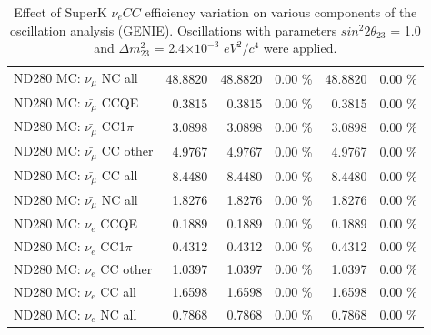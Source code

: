 \begin{table}
\begin{tabular}{| l | r | r  r | r  r |}
                                          ND280 MC: $\nu_{\mu}$ NC all &         48.8820 &         48.8820 &  0.00 \%  &         48.8820 &  0.00 \%  \\ 
                                      ND280 MC: $\bar{\nu_{\mu}}$ CCQE &          0.3815 &          0.3815 &  0.00 \%  &          0.3815 &  0.00 \%  \\ 
                                  ND280 MC: $\bar{\nu_{\mu}}$ CC1$\pi$ &          3.0898 &          3.0898 &  0.00 \%  &          3.0898 &  0.00 \%  \\ 
                                  ND280 MC: $\bar{\nu_{\mu}}$ CC other &          4.9767 &          4.9767 &  0.00 \%  &          4.9767 &  0.00 \%  \\ 
                                    ND280 MC: $\bar{\nu_{\mu}}$ CC all &          8.4480 &          8.4480 &  0.00 \%  &          8.4480 &  0.00 \%  \\ 
                                    ND280 MC: $\bar{\nu_{\mu}}$ NC all &          1.8276 &          1.8276 &  0.00 \%  &          1.8276 &  0.00 \%  \\ 
                                              ND280 MC: $\nu_{e}$ CCQE &          0.1889 &          0.1889 &  0.00 \%  &          0.1889 &  0.00 \%  \\ 
                                          ND280 MC: $\nu_{e}$ CC1$\pi$ &          0.4312 &          0.4312 &  0.00 \%  &          0.4312 &  0.00 \%  \\ 
                                          ND280 MC: $\nu_{e}$ CC other &          1.0397 &          1.0397 &  0.00 \%  &          1.0397 &  0.00 \%  \\ 
                                            ND280 MC: $\nu_{e}$ CC all &          1.6598 &          1.6598 &  0.00 \%  &          1.6598 &  0.00 \%  \\ 
                                            ND280 MC: $\nu_{e}$ NC all &          0.7868 &          0.7868 &  0.00 \%  &          0.7868 &  0.00 \%  \\ 
\hline
\end{tabular}
\caption{ 
  Effect of SuperK $\nu_{e} CC$ efficiency variation
  on various components of the oscillation analysis (GENIE).
  Oscillations with parameters $sin^{2}2\theta_{23}$ = 1.0 and $\Delta m^{2}_{23}$ = 2.4$\times10^{-3}$ $eV^{2}/c^{4}$ were applied.  
}
\label{tab:genie_sk_nuecc_eff}
\end{table}


%
%
%
%

